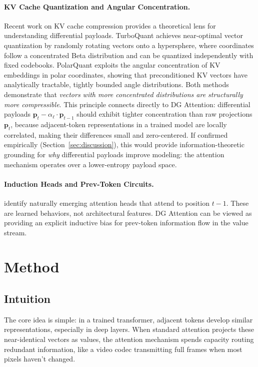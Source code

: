 \documentclass[11pt]{article}
\begin{document}
\paragraph{KV Cache Quantization and Angular Concentration.}
Recent work on KV cache compression provides a theoretical lens for understanding differential payloads. TurboQuant \citep{zandieh2025turboquant} achieves near-optimal vector quantization by randomly rotating vectors onto a hypersphere, where coordinates follow a concentrated Beta distribution and can be quantized independently with fixed codebooks. PolarQuant \citep{han2025polarquant} exploits the angular concentration of KV embeddings in polar coordinates, showing that preconditioned KV vectors have analytically tractable, tightly bounded angle distributions. Both methods demonstrate that \emph{vectors with more concentrated distributions are structurally more compressible}. This principle connects directly to DG Attention: differential payloads $\mathbf{p}_t - \alpha_\ell \cdot \mathbf{p}_{t-1}$ should exhibit tighter concentration than raw projections $\mathbf{p}_t$, because adjacent-token representations in a trained model are locally correlated, making their differences small and zero-centered. If confirmed empirically (Section~\ref{sec:discussion}), this would provide information-theoretic grounding for \emph{why} differential payloads improve modeling: the attention mechanism operates over a lower-entropy payload space.

\paragraph{Induction Heads and Prev-Token Circuits.}
\citet{olsson2022induction} identify naturally emerging attention heads that attend to position $t-1$. These are learned behaviors, not architectural features. DG Attention can be viewed as providing an explicit inductive bias for prev-token information flow in the value stream.

\section{Method}
\label{sec:method}

\subsection{Intuition}

The core idea is simple: in a trained transformer, adjacent tokens develop similar representations, especially in deep layers. When standard attention projects these near-identical vectors as values, the attention mechanism spends capacity routing redundant information, like a video codec transmitting full frames when most pixels haven't changed.
\end{document}
